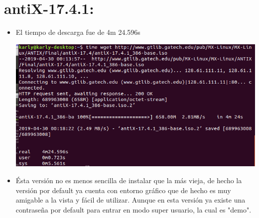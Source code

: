 \documentclass[a4paper, 11pt, oneside]{article}
\begin{document}
\section*{antiX-17.4.1:}
\begin{itemize}
    \item El tiempo de descarga fue de 4m 24.596s
    \begin{center}
        \includegraphics[scale=0.44]{antix1.png}
    \end{center}
    \item Ésta versión no es menos sencilla de instalar que la más vieja, de hecho la versión por default ya cuenta con entorno gráfico que de hecho es muy amigable a la vista y fácil de utilizar. Aunque en esta versión ya existe una contraseña por default para entrar en modo super usuario, la cual es "demo".
    

\end{itemize}
\end{document}
